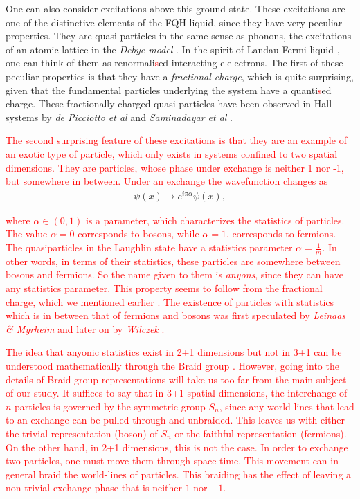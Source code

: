 One can also consider excitations above this ground state. These excitations are one of the distinctive elements of the FQH liquid, since they have very peculiar properties. They are quasi-particles in the same sense as phonons, the excitations of an atomic lattice in the \textit{Debye model} \cite{Debye1912}. In the spirit of Landau-Fermi liquid \cite{Landau:1956zuh}, one can think of them as renormali\textcolor{red}{s}ed interacting elelectrons. The first of these peculiar properties is that they have a \textit{fractional charge}, which is quite surprising, given that the fundamental particles underlying the system have a quanti\textcolor{red}{s}ed charge. These fractionally charged quasi-particles have been observed in Hall systems by \textit{de Picciotto et al} and \textit{Saminadayar et al} \cite{dePicciotto:1997qc, PhysRevLett.79.2526}.

 \textcolor{red}{The second surprising feature of these excitations is that they are an example of an exotic type of particle, which only exists in systems confined to two spatial dimensions. They are particles, whose phase under exchange is neither 1 nor -1, but somewhere in between. Under an exchange the wavefunction changes as}
\begin{align}
    \psi(x) \rightarrow e^{ i\pi  \alpha} \psi(x),
\end{align}

 \textcolor{red}{where $\alpha \in (0,1)$ is a parameter, which characterizes the statistics of particles. The value $\alpha=0 $ corresponds to bosons, while $\alpha=1$, corresponds to fermions. The quasiparticles in the Laughlin state have a statistics parameter $\alpha = \frac{1}{m}$. In other words, in terms of their statistics, these particles are somewhere between bosons and fermions.  So the name given to them is \textit{anyons}, since they can have any statistics parameter. This property seems to follow from the fractional charge, which we mentioned earlier \cite{Halperin:1983zz, Wilczek:1981du}. The existence of particles with statistics which is in between that of fermions and bosons was first speculated by \textit{Leinaas \& Myrheim} \cite{Leinaas:1977fm} and later on by \textit{Wilczek} \cite{PhysRevLett.49.957}.}

 \textcolor{red}{The idea that anyonic statistics exist in 2+1 dimensions but not in 3+1 can be understood mathematically through the Braid group \cite{PhysRevLett.52.2103, Artin1947}. However, going into the details of Braid group representations will take us too far from the main subject of our study. It suffices to say that in 3+1 spatial dimensions, the interchange of $n$ particles is governed by the symmetric group $S_n$, since any world-lines that lead to an exchange can be pulled through and unbraided. This leaves us with either the trivial representation (boson) of $S_n$ or the faithful representation (fermions). On the other hand, in 2+1 dimensions, this is not the case. In order to exchange two particles, one must move them through space-time. This movement can in general braid the world-lines of particles. This braiding has the effect of leaving a non-trivial exchange phase that is neither $1$ nor $-1$.}


